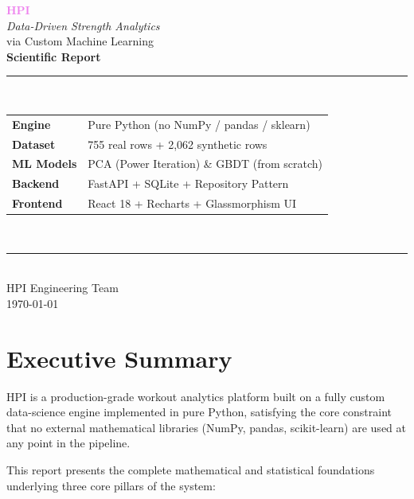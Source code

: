\documentclass[12pt,a4paper]{report}
\theoremstyle{definition}
\begin{document}
\begin{titlepage}
  \centering
  \vspace*{2cm}
  {\Huge\bfseries\textcolor{violet}{HPI}}\\[0.5em]
  {\Large\textit{Data-Driven Strength Analytics}}\\[0.3em]
  {\large via Custom Machine Learning}\\[3cm]

  {\LARGE\bfseries Scientific Report}\\[1cm]
  \rule{0.6\textwidth}{0.4pt}\\[1cm]

  \begin{tabular}{ll}
    \textbf{Engine}    & Pure Python (no NumPy / pandas / sklearn) \\
    \textbf{Dataset}   & 755 real rows + 2{,}062 synthetic rows \\
    \textbf{ML Models} & PCA (Power Iteration) \& GBDT (from scratch) \\
    \textbf{Backend}   & FastAPI + SQLite + Repository Pattern \\
    \textbf{Frontend}  & React 18 + Recharts + Glassmorphism UI \\
  \end{tabular}\\[3cm]

  \rule{0.6\textwidth}{0.4pt}\\[0.5em]
  {\large HPI Engineering Team}\\
  {\normalsize\today}
  \vfill
\end{titlepage}

\tableofcontents
\newpage

\chapter*{Executive Summary}

HPI is a production-grade workout analytics platform built on a fully
custom data-science engine implemented in pure Python, satisfying the core
constraint that no external mathematical libraries (NumPy, pandas, scikit-learn)
are used at any point in the pipeline.

This report presents the complete mathematical and statistical foundations
underlying three core pillars of the system:
\end{document}
